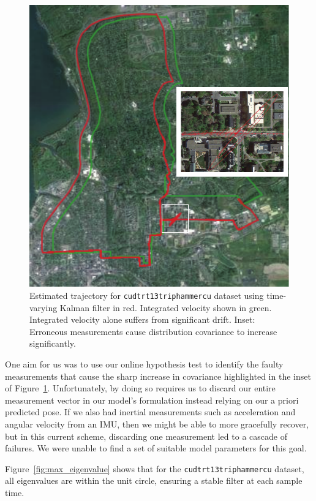 \begin{figure}
\includegraphics[width=\columnwidth]{track2_map}
\caption{Estimated trajectory for \texttt{cudtrt13triphammercu} dataset using time-varying Kalman filter in red.  Integrated velocity shown in green.  Integrated velocity alone suffers from significant drift.  Inset: Erroneous measurements cause distribution covariance to increase significantly.}
\label{fig:track2_map}
\end{figure}

One aim for us was to use our online hypothesis test to identify the faulty measurements that cause the sharp increase in covariance highlighted in the inset of Figure~\ref{fig:track2_map}.  Unfortunately, by doing so requires us to discard our entire measurement vector in our model's formulation instead relying on our a priori predicted pose.  If we also had inertial measurements such as acceleration and angular velocity from an IMU, then we might be able to more gracefully recover, but in this current scheme, discarding one measurement led to a cascade of failures.  We were unable to find a set of suitable model parameters for this goal.

Figure~\ref{fig:max_eigenvalue} shows that for the \texttt{cudtrt13triphammercu} dataset, all eigenvalues are within the unit circle, ensuring a stable filter at each sample time.

